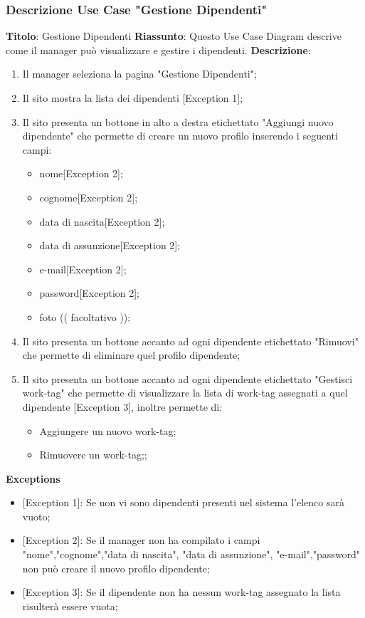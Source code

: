 \documentclass{report}
\begin{document}
\subsubsection*{Descrizione Use Case "Gestione Dipendenti"}
\textbf{Titolo}: Gestione Dipendenti \newline
\textbf{Riassunto}: Questo Use Case Diagram descrive come il manager può visualizzare e gestire i dipendenti. \newline
\textbf{Descrizione}:
\begin{enumerate}
	\item Il manager seleziona la pagina "Gestione Dipendenti";
	\item Il sito mostra la lista dei dipendenti [Exception 1];
	\item Il sito presenta un bottone in alto a destra etichettato "Aggiungi nuovo dipendente" che permette di creare un nuovo profilo inserendo i seguenti campi:
	\begin{itemize}
		\item nome[Exception 2];
		\item cognome[Exception 2]; 
		\item data di nascita[Exception 2];
		\item data di assunzione[Exception 2];
		\item e-mail[Exception 2];
		\item password[Exception 2];
		\item foto (( facoltativo ));
	\end{itemize}
	\item Il sito presenta un bottone accanto ad ogni dipendente etichettato "Rimuovi" che permette di eliminare quel profilo dipendente;
	\item Il sito presenta un bottone accanto ad ogni dipendente etichettato "Gestisci work-tag" che permette di visualizzare la lista di work-tag assegnati a quel dipendente [Exception 3], inoltre permette di:
	\begin{itemize}
		\item Aggiungere un nuovo work-tag;
		\item Rimuovere un work-tag;;
	\end{itemize}
	
\end{enumerate}
\textbf{Exceptions}
\begin{itemize}
	\item {[Exception 1]}: Se non vi sono dipendenti presenti nel sistema l'elenco sarà vuoto;
	\item {[Exception 2]}: Se il manager non ha compilato i campi "nome","cognome","data di nascita", "data di assunzione", "e-mail","password" non può creare il nuovo profilo dipendente;
	\item {[Exception 3]}: Se il dipendente non ha nessun work-tag assegnato la lista risulterà essere vuota;
\end{itemize}
\end{document}
